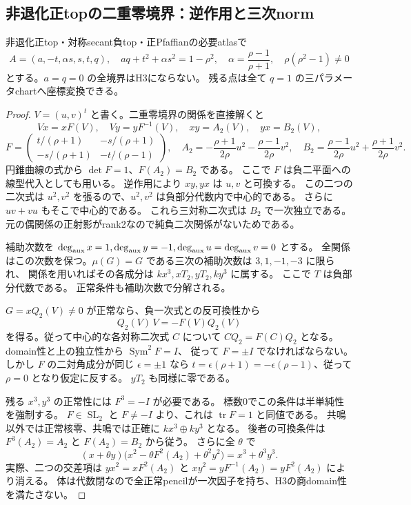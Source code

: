 \subsection{非退化正topの二重零境界：逆作用と三次norm}
\begin{proposition}
非退化正top・対称secant負top・正Pfaffianの必要atlasで
\[
 A=(a,-t,\alpha s,s,t,q),\quad
 aq+t^2+\alpha s^2=1-\rho^2,\quad
 \alpha=\frac{\rho-1}{\rho+1},\quad\rho(\rho^2-1)\ne0
\]
とする。$a=q=0$ の全境界はH3にならない。
残る点は全て $q=1$ の三パラメータchartへ座標変換できる。
\end{proposition}
\begin{proof}
$V=(u,v)^t$ と書く。二重零境界の関係を直接解くと
\[
 Vx=xF(V),\quad Vy=yF^{-1}(V),\quad xy=A_2(V),\quad yx=B_2(V),
\]
\[
 F=\begin{pmatrix}t/(\rho+1)&-s/(\rho+1)\\-s/(\rho+1)&-t/(\rho-1)\end{pmatrix},
\quad A_2=-\frac{\rho+1}{2\rho}u^2-\frac{\rho-1}{2\rho}v^2,
\quad B_2=\frac{\rho-1}{2\rho}u^2+\frac{\rho+1}{2\rho}v^2.
\]
円錐曲線の式から $\det F=1$、$F(A_2)=B_2$ である。
ここで $F$ は負二平面への線型代入としても用いる。
逆作用により $xy,yx$ は $u,v$ と可換する。
この二つの二次式は $u^2,v^2$ を張るので、$u^2,v^2$ は負部分代数内で中心的である。
さらに $uv+vu$ もそこで中心的である。
これら三対称二次式は $B_2$ で一次独立である。元の偶関係の正射影がrank2なので純負二次関係がないためである。

補助次数を $\deg_{\rm aux}x=1,\deg_{\rm aux}y=-1,\deg_{\rm aux}u=\deg_{\rm aux}v=0$ とする。
全関係はこの次数を保つ。$\mu(G)=G$ である三次の補助次数は $3,1,-1,-3$ に限られ、
関係を用いればその各成分は $kx^3,xT_2,yT_2,ky^3$ に属する。
ここで $T$ は負部分代数である。
正常条件も補助次数で分解される。

$G=xQ_2(V)\ne0$ が正常なら、負一次式との反可換性から
\[
 Q_2(V)\,V=-F(V)Q_2(V)
\]
を得る。従って中心的な各対称二次式 $C$ について
$C Q_2=F(C)Q_2$ となる。domain性と上の独立性から $\operatorname{Sym}^2F=I$、
従って $F=\pm I$ でなければならない。
しかし $F$ の二対角成分が同じ $\epsilon=\pm1$ なら
$t=\epsilon(\rho+1)=-\epsilon(\rho-1)$、従って $\rho=0$ となり仮定に反する。
$yT_2$ も同様に零である。

残る $x^3,y^3$ の正常性には $F^3=-I$ が必要である。
標数0でこの条件は半単純性を強制する。
$F\in\operatorname{SL}_2$ と $F\ne-I$ より、これは $\operatorname{tr}F=1$ と同値である。
共鳴以外では正常核零、共鳴では正確に $kx^3\oplus ky^3$ となる。
後者の可換条件は $F^3(A_2)=A_2$ と $F(A_2)=B_2$ から従う。
さらに全 $\theta$ で
\[
 (x+\theta y)\bigl(x^2-\theta F^2(A_2)+\theta^2y^2\bigr)
   =x^3+\theta^3y^3.
\]
実際、二つの交差項は $yx^2=xF^2(A_2)$ と
$xy^2=yF^{-1}(A_2)=yF^2(A_2)$ により消える。
体は代数閉なので全正常pencilが一次因子を持ち、H3の商domain性を満たさない。


\end{proof}
